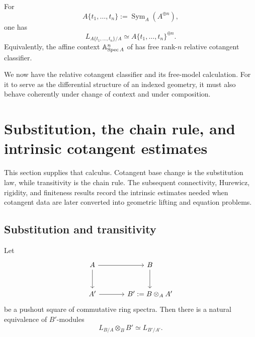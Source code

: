 \begin{corollary}
\label{cor:cotangent-brave-new-affine-space}
For
\[
    A\{t_1,\ldots,t_n\}
    :=
    \operatorname{Sym}_A(A^{\oplus n}),
\]
one has
\[
    L_{A\{t_1,\ldots,t_n\}/A}
    \simeq
    A\{t_1,\ldots,t_n\}^{\oplus n}.
\]
Equivalently, the affine context \(\mathbb A^n_{\operatorname{Spec} A}\) of
 has free rank-\(n\) relative cotangent
classifier.
\end{corollary}
We now have the relative cotangent classifier and its free-model
calculation. For it to serve as the differential structure of an indexed
geometry, it must also behave coherently under change of context and under
composition.

\section{Substitution, the chain rule, and intrinsic cotangent estimates}
\label{sec:cotangent-substitution-transitivity}

This section supplies that calculus. Cotangent base change is the
substitution law, while transitivity is the chain rule. The subsequent
connectivity, Hurewicz, rigidity, and finiteness results record the intrinsic
estimates needed when cotangent data are later converted into geometric
lifting and equation problems.

\subsection{Substitution and transitivity}

\begin{theorem}
\label{thm:cotangent-base-change}
Let
\[
\begin{tikzcd}[column sep=large, row sep=large]
    A \arrow[r] \arrow[d]
        & B \arrow[d]
    \\
    A' \arrow[r]
        & B':=B\otimes_AA'
\end{tikzcd}
\]
be a pushout square of commutative ring spectra. Then there is a natural
equivalence of \(B'\)-modules
\[
    L_{B/A}\otimes_BB'
    \simeq
    L_{B'/A'}.
\]
\end{theorem}

